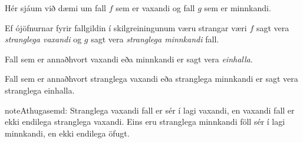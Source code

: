 \documentclass[a4paper,10pt,icelandic]{sphinxmanual}
\begin{document}

Hér sjáum við dæmi um fall \(f\) sem er vaxandi og fall \(g\) sem er minnkandi.

Ef ójöfnurnar fyrir fallgildin í skilgreiningunum væru strangar væri \(f\) sagt vera \textit{stranglega vaxandi} og \(g\) sagt vera \textit{stranglega minnkandi} fall.

Fall sem er annaðhvort vaxandi eða minnkandi er sagt vera \textit{einhalla}.

Fall sem er annaðhvort stranglega vaxandi eða stranglega minnkandi er sagt vera stranglega einhalla.

\begin{sphinxadmonition}{note}{Athugasemd:}
Stranglega vaxandi fall er sér í lagi vaxandi, en vaxandi fall er ekki endilega stranglega vaxandi. Eins eru stranglega minnkandi föll sér í lagi minnkandi, en ekki endilega öfugt.
\end{sphinxadmonition}
\end{document}
